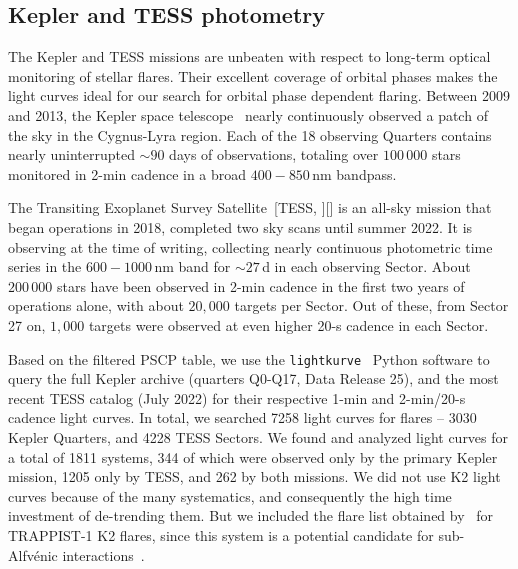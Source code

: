 \documentclass[twocolumn]{aastex631}
\begin{document}
\subsection{Kepler and TESS photometry}
\label{sec:data:photometry}
The Kepler and TESS missions are unbeaten with respect to long-term optical monitoring of stellar flares. Their excellent coverage of orbital phases makes the light curves ideal for our search for orbital phase dependent flaring. Between 2009 and 2013, the Kepler space telescope~\citep{koch2010kepler} nearly continuously observed a patch of the sky in the Cygnus-Lyra region. Each of the 18 observing Quarters contains nearly uninterrupted $\sim 90$ days of observations, totaling over $100\,000$ stars monitored in 2-min cadence in a broad $400-850\,$nm bandpass.

The Transiting Exoplanet Survey Satellite~[TESS, ][]\citep{ricker2015transiting} is an all-sky mission that began operations in 2018, completed two sky scans until summer 2022. It is observing at the time of writing, collecting nearly continuous photometric time series in the $600-1000\,$nm band for $\sim 27\,$d in each observing Sector. About $200\,000$ stars have been observed in 2-min cadence in the first two years of operations alone, with about $20,000$ targets per Sector. Out of these, from Sector 27 on, $1,000$ targets were observed at even higher 20-s cadence in each Sector. 

Based on the filtered PSCP table, we use the \texttt{lightkurve}~\citep{lightkurvecollaboration2018lightkurve} Python software to query the full Kepler archive (quarters Q0-Q17, Data Release 25), and the most recent TESS catalog (July 2022) for their respective 1-min and 2-min/20-s cadence light curves. In total, we searched 7258 light curves for flares -- 3030 Kepler Quarters, and 4228 TESS Sectors. We found and analyzed light curves for a total of 1811 systems, 344 of which were observed only by the primary Kepler mission, 1205 only by TESS, and 262 by both missions. We did not use K2 light curves because of the many systematics, and consequently the high time investment of de-trending them. But we included the flare list obtained by~\citet{paudel2018k2} for TRAPPIST-1 K2 flares, since this system is a potential candidate for sub-Alfv\'enic interactions~\citep{fischer2019timevariable}.
\end{document}
